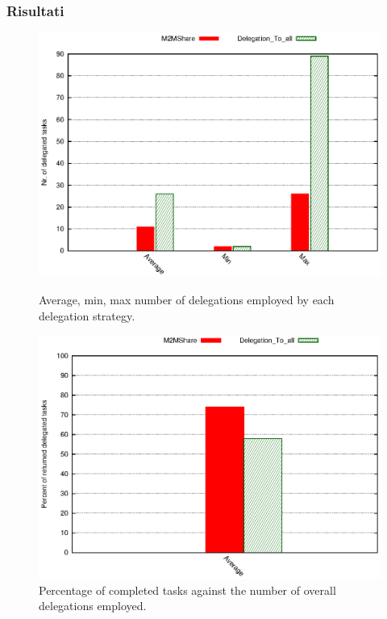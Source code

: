 \documentclass{beamer}
\begin{document}
\begin{frame}
\frametitle{Risultati}
\begin{figure}[ht]
\begin{minipage}[b]{0.45\linewidth}
\centering
\includegraphics[scale=0.4]{../grafici/delegheFatte.eps}
\caption{Average, min, max number of delegations employed by each delegation strategy.}
\end{minipage}
\hspace{0.5cm}
\begin{minipage}[b]{0.45\linewidth}
\centering
\pause
\includegraphics[scale=0.4]{../grafici/percDeleghe.eps}
\caption{Percentage of completed tasks against the number of overall delegations employed.}
\end{minipage}
\end{figure}
\end{frame}
\end{document}
